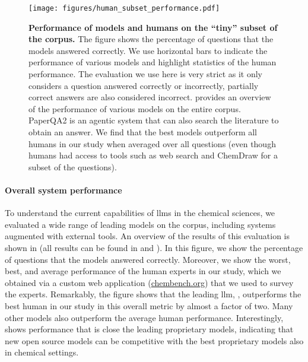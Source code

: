 \documentclass[11pt, oneside]{article}
\begin{document}
\begin{refsection}
\begin{figure}[!h]
    \centering
    \texttt{[image: figures/human\_subset\_performance.pdf]}
    \caption{\textbf{Performance of models and humans on the \enquote{tiny} subset of the  \chembench corpus.} The figure shows the percentage of questions that the models answered correctly. We use horizontal bars to indicate the performance of various models and highlight statistics of the human performance.
    The evaluation we use here is very strict as it only considers a question answered correctly or incorrectly, partially correct answers are also considered incorrect.
     provides an overview of the performance of various models on the entire corpus.
    PaperQA2\autocite{skarlinski2024language} is an agentic system that can also search the literature to obtain an answer. We find that the best models outperform all humans in our study when averaged over all questions (even though humans had access to tools such as web search and ChemDraw for a subset of the questions).
    }
    \label{fig:human_vs_models_bar}
\end{figure}

\paragraph{Overall system performance}
To understand the current capabilities of \glspl{llm} in the chemical sciences, we evaluated a wide range of leading models\autocite{Huggingface} on the \chembench corpus, including systems augmented with external tools.
An overview of the results of this evaluation is shown in  (all results can be found in  and ).
In this figure, we show the percentage of questions that the models answered correctly.
Moreover, we show the worst, best, and average performance of the human experts in our study, which we obtained via a custom web application (\url{chembench.org}) that we used to survey the experts.
Remarkably, the figure shows that the leading \gls{llm}, \oone, outperforms the best human in our study in this overall metric by almost a factor of two.
Many other models also outperform the average human performance.
Interestingly, \LlamaThreeOneFourZeroFiveBInstruct shows performance that is close the leading proprietary models, indicating that new open source models can be competitive with the best proprietary models also in chemical settings.


\end{refsection}
\end{document}
